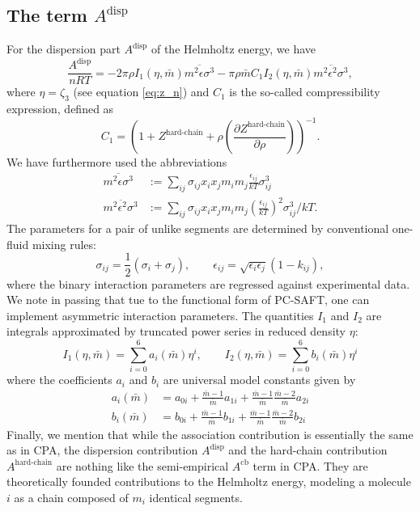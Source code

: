 \documentclass[internal,english]{sintefmemo2012}
\newcommand*{\pder}[2]{\left(\frac{\partial #1}{\partial #2}\right)}
\newcommand{\lp}{\left(}
\newcommand{\rp}{\right)}
\begin{document}
\subsection{The term $A^{\text{disp}}$}
For the dispersion part $A^{\text{disp}}$ of the Helmholtz energy, we have
\begin{equation}
  \frac{A^{\text{disp}}}{nRT} = -2 \pi \rho I_1(\eta,\bar m) \overline{m^2 \epsilon \sigma^3} - \pi \rho \bar m C_1 I_2(\eta,\bar m) \overline{m^2 \epsilon^2 \sigma^3},
\end{equation}
where $\eta = \zeta_3$ (see equation \eqref{eq:z_n}) and $C_1$ is the so-called
compressibility expression, defined as
\begin{equation}
  C_1 = \lp 1+Z^{\text{hard-chain}} + \rho \pder{Z^{\text{hard-chain}}}{\rho} \rp^{-1}.
\end{equation}
We have furthermore used the abbreviations
\begin{align}
  \overline{m^2\epsilon \sigma^3} &:= \sum_{ij} \sigma_{ij} x_i x_j m_i m_j \frac{\epsilon_{ij}}{kT} \sigma_{ij}^3 \\
  \overline{m^2\epsilon^2\sigma^3} &:= \sum_{ij} \sigma_{ij} x_i x_j m_i m_j \lp \frac{\epsilon_{ij}}{kT} \rp^2 \sigma_{ij}^3/kT.
\end{align}
The parameters for a pair of unlike segments are determined by conventional
one-fluid mixing rules:
\begin{equation}
  \sigma_{ij} = \frac{1}{2}(\sigma_i + \sigma_j), \qquad  \epsilon_{ij} = \sqrt{\epsilon_i \epsilon_j} (1-k_{ij}),
\end{equation}
where the binary interaction parameters are regressed against experimental
data. We note in passing that tue to the functional form of PC-SAFT, one can
implement asymmetric interaction parameters. The quantities $I_1$ and $I_2$ are
integrals approximated by truncated power series in reduced density $\eta$:
\begin{equation}
  I_1(\eta,\bar m) = \sum_{i=0}^6 a_i(\bar m) \eta^i, \qquad  I_2(\eta,\bar m) = \sum_{i=0}^6 b_i(\bar m) \eta^i
\end{equation}
where the coefficients $a_i$ and $b_i$ are universal model constants given by
\begin{align}
  a_i(\bar m) &= a_{0i} + \frac{\bar m -1}{\bar m}a_{1i} + \frac{\bar m -1}{\bar m} \frac{\bar m -2}{\bar m}a_{2i} \\
  b_i(\bar m) &= b_{0i} + \frac{\bar m -1}{\bar m}b_{1i} + \frac{\bar m -1}{\bar m} \frac{\bar m -2}{\bar m}b_{2i}
\end{align}
Finally, we mention that while the association contribution is essentially the
same as in CPA, the dispersion contribution $A^{\text{disp}}$ and the hard-chain
contribution $A^{\text{hard-chain}}$ are nothing like the semi-empirical
$A^{\text{cb}}$ term in CPA. They are theoretically founded contributions to the
Helmholtz energy, modeling a molecule $i$ as a chain composed of $m_i$ identical
segments.
\end{document}
